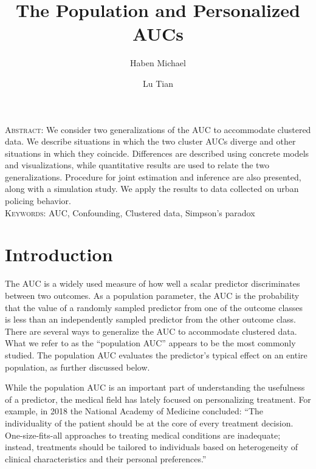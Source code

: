 \documentclass[12pt]{article}
\title{The Population and Personalized AUCs}
\author[1]{Haben Michael}
\author[2]{Lu Tian}
\affil[1]{Department of Mathematics and Statistics, University of Massachusetts}
\affil[2]{Department of Biomedical Data Science, Stanford University}
\date{}
\begin{document}
\maketitle
\noindent\textsc{Abstract:} We consider two generalizations of the AUC to accommodate
clustered data. We describe situations in which the two cluster AUCs
diverge and other situations in which they coincide. Differences are described using concrete models and visualizations, while quantitative results are used to relate the two generalizations. Procedure for joint estimation and inference are also presented, along with a simulation study. We apply the results to data collected on urban policing behavior.\\
\textsc{Keywords:} AUC, Confounding, Clustered data, Simpson's paradox

\section{Introduction}
The AUC is a widely used measure of how well a scalar predictor
discriminates between two outcomes. As a population parameter, the AUC
is the probability that the value of a randomly sampled predictor from
one of the outcome classes is less than an independently sampled
predictor from the other outcome class. There are several ways to
generalize the AUC to accommodate clustered data. What we refer to as
the ``population AUC'' appears to be the most commonly studied. The
population AUC evaluates the predictor's typical effect on an entire
population, as further discussed below.

While the population AUC is an important part of understanding the
usefulness of a predictor, the medical field has lately focused on
personalizing treatment. %
For example, in 2018 the National Academy of Medicine concluded: ``The
individuality of the patient should be at the core of every treatment
decision. One-size-fits-all approaches to treating medical conditions
are inadequate; instead, treatments should be tailored to individuals
based on heterogeneity of clinical characteristics and their personal
preferences.''
\end{document}
